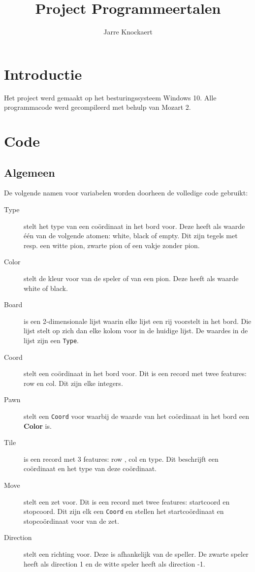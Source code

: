 \documentclass{article}
\title{Project Programmeertalen}
\author{Jarre Knockaert}
\date{}
\begin{document}
\maketitle
\newpage
		
\section{Introductie}

Het project werd gemaakt op het besturingssysteem Windows 10. 
Alle programmacode werd gecompileerd met behulp van Mozart 2. 

\section{Code}	

\subsection{Algemeen}

De volgende namen voor variabelen worden doorheen de volledige code gebruikt:
\begin{description}
	\item[Type] stelt het type van een coördinaat in het bord voor. Deze heeft als waarde één van de volgende atomen: white, black of empty. Dit zijn tegels met resp. een witte pion, zwarte pion of een vakje zonder pion. 
	\item[Color] stelt de kleur voor van de speler of van een pion.  Deze heeft als waarde  white of black.
	\item[Board] is een 2-dimensionale lijst waarin elke lijst een rij voorstelt in het bord. Die lijst stelt op zich dan elke kolom voor in de huidige lijst. De waardes in de lijst zijn een \texttt{Type}.
	\item[Coord] stelt een coördinaat in het bord voor. Dit is een record met twee features: row en col. Dit zijn elke integers. 
	\item[Pawn] stelt een \texttt{Coord} voor waarbij de waarde van het coördinaat in het bord een \textbf{Color} is.
	\item[Tile] is een record met 3 features: row , col en type. Dit beschrijft een coördinaat en het type van deze coördinaat.
	\item[Move] stelt een zet voor. Dit is een record met twee features: startcoord en stopcoord. Dit zijn elk een \texttt{Coord} en stellen het startcoördinaat en stopcoördinaat voor van de zet.
	\item[Direction] stelt een richting voor. Deze is afhankelijk van de speller. De zwarte speler heeft als direction 1 en de witte speler heeft als direction -1.
\end{description}
\end{document}
